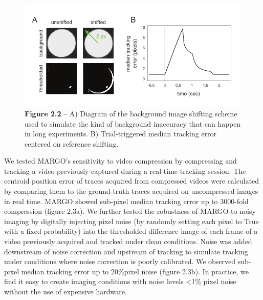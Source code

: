 \documentclass[12pt,letterpaper]{article}
\begin{document}
\begin{figure}[t!]
 \includegraphics[width=\textwidth]{../figures/chapter_2/fig_2-2.pdf}
 \vspace{.1in}
 \caption*{\textbf{Figure 2.2} -- A) Diagram of the background image shifting scheme used to simulate the kind of background inaccuracy that can happen in long experiments. B) Trial-triggered median tracking error centered on reference shifting.}
\end{figure}

We tested MARGO's sensitivity to video compression by compressing and tracking a video previously captured during a real-time tracking session. The centroid position error of traces acquired from compressed videos were calculated by comparing them to the ground-truth traces acquired on uncompressed images in real time. MARGO showed sub-pixel median tracking error up to 3000-fold compression (figure 2.3a). We further tested the robustness of MARGO to noisy imaging by digitally injecting pixel noise (by randomly setting each pixel to True with a fixed probability) into the thresholded difference image of each frame of a video previously acquired and tracked under clean conditions. Noise was added downstream of noise correction and upstream of tracking to simulate tracking under conditions where noise correction is poorly calibrated. We observed sub-pixel median tracking error up to 20\%pixel noise (figure 2.3b). In practice, we find it easy to create imaging conditions with noise levels <1\% pixel noise without the use of expensive hardware.
\end{document}

